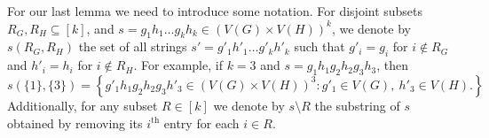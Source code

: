 \documentclass[a4paper,onecolumn,11pt,accepted=2026-01-06]{quantumarticle}
\theoremstyle{plain}
\newtheorem{cor}[thm]{Corollary}
\theoremstyle{remark}
\theoremstyle{definition}
\begin{document}


For our last lemma we need to introduce some notation. For disjoint subsets $R_G, R_H \subseteq [k]$, and $s = g_1h_1\ldots g_kh_k \in (V(G) \times V(H))^k$, we denote by $s(R_G,R_H)$ the set of all strings $s' = g'_1h'_1\ldots g'_kh'_k$ such that $g'_i = g_i$ for $i \notin R_G$ and $h'_i = h_i$ for $i \notin R_H$. For example, if $k = 3$ and $s = g_1h_1g_2h_2g_3h_3$, then 
\[s(\{1\},\{3\}) = \left\{g'_1h_1g_2h_2g_3h'_3 \in (V(G) \times V(H))^3 : g'_1 \in V(G), \ h'_3 \in V(H).\right\}\]
Additionally, for any subset $R \in [k]$ we denote by $s\setminus R$ the substring of $s$ obtained by removing its $i^\text{th}$ entry for each $i \in R$.
\end{document}
